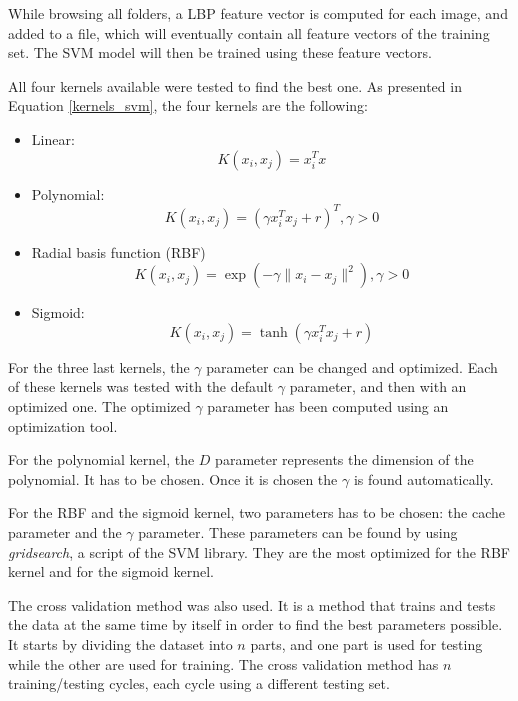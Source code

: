 \noindent While browsing all folders, a LBP feature vector is computed for each image, and added to a file, which will eventually contain all feature vectors of the training set. The SVM model will then be trained using these feature vectors.
\newline

\noindent All four kernels available were tested to find the best one. As presented in Equation \ref{kernels_svm}, the four kernels are the following:

\begin{itemize}
  \item Linear:
  \begin{equation}
K(x_i,x_j) = x_i^Tx
\end{equation}

  \item Polynomial:
  \begin{equation}
K(x_i,x_j) = (\gamma x_i^Tx_j + r)^T, \gamma > 0
\end{equation}

  \item Radial basis function (RBF)
  \begin{equation}
K(x_i,x_j) = \exp(-\gamma \| x_i - x_j \|^2), \gamma > 0
\end{equation}

  \item Sigmoid:
  \begin{equation}
K(x_i,x_j) = \tanh(\gamma x_i^T x_j + r)
	\end{equation}
\end{itemize}

\vspace{\baselineskip}
\noindent For the three last kernels, the $\gamma$ parameter can be changed and optimized. Each of these kernels was tested with the default $\gamma$ parameter, and then with an optimized one. The optimized $\gamma$ parameter has been computed using an optimization tool.
\newline

\noindent For the polynomial kernel, the $D$ parameter represents the dimension of the polynomial. It has to be chosen. Once it is chosen the $ \gamma $ is found automatically.
\newline

\noindent For the RBF and the sigmoid kernel, two parameters has to be chosen: the cache parameter and the $\gamma$ parameter. These parameters can be found by using \textit{gridsearch}, a script of the SVM library. They are the most optimized for the RBF kernel and for the sigmoid kernel.
\newline

\noindent The cross validation method was also used. It is a method that trains and tests the data at the same time by itself in order to find the best parameters possible. It starts by dividing the dataset into $ n $ parts, and one part is used for testing while the other are used for training. The cross validation method has $n$ training/testing cycles, each cycle using a different testing set.  
\newline






